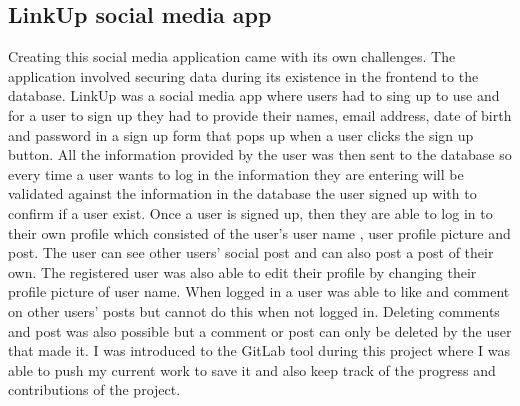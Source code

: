 \documentclass[paper=a4, fontsize=11pt]{scrartcl}
\numberwithin{equation}{section}		%
\numberwithin{figure}{section}			%
\numberwithin{table}{section}				%
\begin{document}
\subsection{ LinkUp social media app }
Creating this social media application came with its own challenges. The application involved securing data during its existence in the frontend to the database. LinkUp was a social media app where users had to sing up to use and for a user to sign up they had to provide their names, email address, date of birth and password in a sign up form that pops up when a user clicks the sign up button. All the information provided by the user was then sent to the database so every time a user wants to log in the information they are entering will be validated against the information in the database the user signed up with to confirm if a user exist.
 Once a user is signed up, then they are able to log in to their own profile which consisted of the user’s user name , user profile picture and post. The user can see other users’ social post and can also post a post of their own. The registered user was also able to edit their profile by changing their profile picture of user name. When logged in a user was able to like and comment on other users’ posts but cannot do this when not logged in. Deleting comments and post was also possible but a comment or post can only be deleted by the user that made it. I was introduced to the  GitLab tool  during this project where I was able to push my current work to save it and also keep track of the progress and contributions of the project. 
\end{document}
